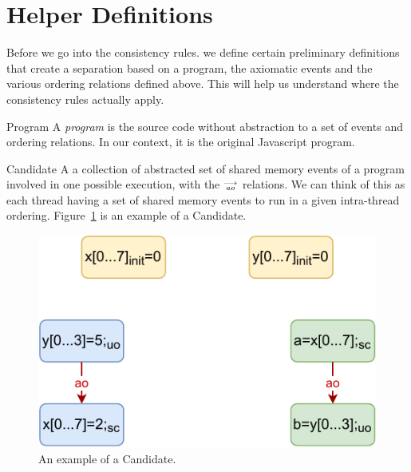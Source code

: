\section{Helper Definitions}
    
    Before we go into the consistency rules. we define certain preliminary definitions that create a separation based on a program, the axiomatic events and the various ordering relations defined above. This will help us understand where the consistency rules actually apply.    
    
    \begin{definition}{Program} 
        A \emph{program} is the source code without abstraction to a set of events and ordering relations. In our context, it is the original Javascript program. 
        
    \end{definition}
    
    \begin{definition}{Candidate}
        A a collection of abstracted set of shared memory events of a program involved in one possible execution, with the $\stackrel{\longrightarrow}{_\textit{ao}}$ relations. 
        We can think of this as each thread having a set of shared memory events to run in a given intra-thread ordering. 
        Figure~\ref{model:candidate} is an example of a Candidate.
        \begin{figure}[H]
            \centering
            \includegraphics[scale=0.7]{3.ECMAScriptMemoryModel/candidate.pdf}
            \caption{An example of a Candidate.}
            \label{model:candidate}
        \end{figure}
        
    \end{definition}

